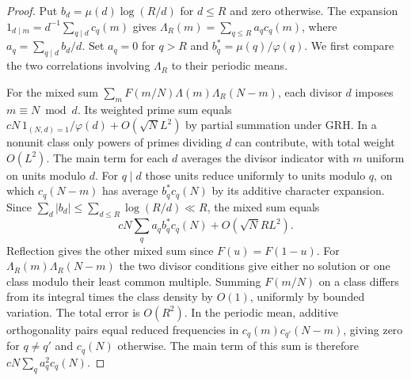 \documentclass[11pt,a4paper]{article}
\numberwithin{equation}{section}
\begin{document}
\begin{proof}
Put $b_d=\mu(d)\log(R/d)$ for $d\le R$ and zero otherwise.
The expansion $1_{d\mid m}=d^{-1}\sum_{q\mid d}c_q(m)$ gives
$\Lambda_R(m)=\sum_{q\le R}a_q c_q(m)$, where
$a_q=\sum_{q\mid d}b_d/d$. Set $a_q=0$ for $q>R$ and
$b_q^*=\mu(q)/\varphi(q)$. We first compare the two correlations
involving $\Lambda_R$ to their periodic means.

For the mixed sum $\sum_m F(m/N)\Lambda(m)\Lambda_R(N-m)$,
each divisor $d$ imposes $m\equiv N\bmod d$. Its weighted prime
sum equals $cN\,1_{(N,d)=1}/\varphi(d)+O(\sqrt N L^2)$ by
partial summation under GRH. In a nonunit class only powers
of primes dividing $d$ can contribute, with total weight $O(L^2)$.
The main term for each $d$ averages the divisor indicator with
$m$ uniform on units modulo $d$. For $q\mid d$ those units reduce
uniformly to units modulo $q$, on which $c_q(N-m)$ has average
$b_q^*c_q(N)$ by its additive character expansion. Since
$\sum_d|b_d|\le\sum_{d\le R}\log(R/d)\ll R$, the mixed sum equals
\[
 cN\sum_q a_q b_q^*c_q(N)+O(\sqrt N R L^2).
\]
Reflection gives the other mixed sum since $F(u)=F(1-u)$.
For $\Lambda_R(m)\Lambda_R(N-m)$ the two divisor conditions
give either no solution or one class modulo their least common
multiple. Summing $F(m/N)$ on a class differs from its integral
times the class density by $O(1)$, uniformly by bounded variation.
The total error is $O(R^2)$. In the periodic mean, additive
orthogonality pairs equal reduced frequencies in $c_q(m)c_{q'}(N-m)$,
giving zero for $q\ne q'$ and $c_q(N)$ otherwise. The main term
of this sum is therefore $cN\sum_q a_q^2c_q(N)$.


\end{proof}
\end{document}
